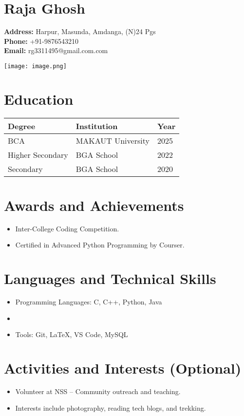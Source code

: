 \documentclass[a4paper,12pt]{article}
\begin{document}
\begin{minipage}[t]{0.7\textwidth}
    \section*{Raja Ghosh}
    \textbf{Address:} Harpur, Masunda, Amdanga, (N)24 Pgs\\
    \textbf{Phone:} +91-9876543210\\
    \textbf{Email:} rg3311495@gmail.com.com
\end{minipage}
\hfill
\begin{minipage}[t]{0.25\textwidth}
    \texttt{[image: image.png]} %
\end{minipage}

\vspace{1em}

\section*{Education}
\begin{tabular}{|p{4cm}|p{4cm}|p{4cm}|}
\hline
\textbf{Degree} & \textbf{Institution} & \textbf{Year} \\
\hline
BCA & MAKAUT University & 2025 \\
Higher Secondary & BGA School & 2022 \\
Secondary & BGA School & 2020 \\
\hline
\end{tabular}

\section*{Awards and Achievements}
\begin{itemize}
    \item  Inter-College Coding Competition.
    \item Certified in Advanced Python Programming by Courser.
\end{itemize}

\section*{Languages and Technical Skills}
\begin{itemize}
    \item Programming Languages: C, C++, Python, Java
    \item 
    \item Tools: Git, LaTeX, VS Code, MySQL
\end{itemize}

\section*{Activities and Interests (Optional)}
\begin{itemize}
    \item Volunteer at NSS – Community outreach and teaching.
    \item Interests include photography, reading tech blogs, and trekking.
\end{itemize}
\end{document}
